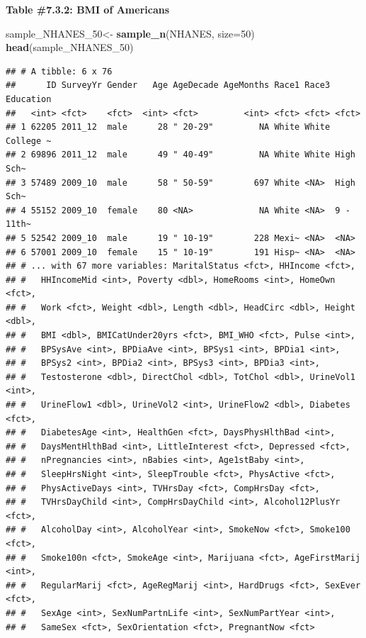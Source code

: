 \documentclass[]{book}
\newenvironment{Shaded}{\begin{snugshade}}{\end{snugshade}}
\newcommand{\DataTypeTok}[1]{\textcolor[rgb]{0.13,0.29,0.53}{#1}}
\newcommand{\DecValTok}[1]{\textcolor[rgb]{0.00,0.00,0.81}{#1}}
\newcommand{\KeywordTok}[1]{\textcolor[rgb]{0.13,0.29,0.53}{\textbf{#1}}}
\newcommand{\NormalTok}[1]{#1}
\newcommand{\StringTok}[1]{\textcolor[rgb]{0.31,0.60,0.02}{#1}}
\begin{document}
\textbf{Table \#7.3.2: BMI of Americans}

\begin{Shaded}
\begin{Highlighting}[]
\NormalTok{sample_NHANES_}\DecValTok{50}\NormalTok{<-}
\StringTok{  }\KeywordTok{sample_n}\NormalTok{(NHANES, }\DataTypeTok{size=}\DecValTok{50}\NormalTok{)}
\KeywordTok{head}\NormalTok{(sample_NHANES_}\DecValTok{50}\NormalTok{)}
\end{Highlighting}
\end{Shaded}

\begin{verbatim}
## # A tibble: 6 x 76
##      ID SurveyYr Gender   Age AgeDecade AgeMonths Race1 Race3 Education
##   <int> <fct>    <fct>  <int> <fct>         <int> <fct> <fct> <fct>    
## 1 62205 2011_12  male      28 " 20-29"         NA White White College ~
## 2 69896 2011_12  male      49 " 40-49"         NA White White High Sch~
## 3 57489 2009_10  male      58 " 50-59"        697 White <NA>  High Sch~
## 4 55152 2009_10  female    80 <NA>             NA White <NA>  9 - 11th~
## 5 52542 2009_10  male      19 " 10-19"        228 Mexi~ <NA>  <NA>     
## 6 57001 2009_10  female    15 " 10-19"        191 Hisp~ <NA>  <NA>     
## # ... with 67 more variables: MaritalStatus <fct>, HHIncome <fct>,
## #   HHIncomeMid <int>, Poverty <dbl>, HomeRooms <int>, HomeOwn <fct>,
## #   Work <fct>, Weight <dbl>, Length <dbl>, HeadCirc <dbl>, Height <dbl>,
## #   BMI <dbl>, BMICatUnder20yrs <fct>, BMI_WHO <fct>, Pulse <int>,
## #   BPSysAve <int>, BPDiaAve <int>, BPSys1 <int>, BPDia1 <int>,
## #   BPSys2 <int>, BPDia2 <int>, BPSys3 <int>, BPDia3 <int>,
## #   Testosterone <dbl>, DirectChol <dbl>, TotChol <dbl>, UrineVol1 <int>,
## #   UrineFlow1 <dbl>, UrineVol2 <int>, UrineFlow2 <dbl>, Diabetes <fct>,
## #   DiabetesAge <int>, HealthGen <fct>, DaysPhysHlthBad <int>,
## #   DaysMentHlthBad <int>, LittleInterest <fct>, Depressed <fct>,
## #   nPregnancies <int>, nBabies <int>, Age1stBaby <int>,
## #   SleepHrsNight <int>, SleepTrouble <fct>, PhysActive <fct>,
## #   PhysActiveDays <int>, TVHrsDay <fct>, CompHrsDay <fct>,
## #   TVHrsDayChild <int>, CompHrsDayChild <int>, Alcohol12PlusYr <fct>,
## #   AlcoholDay <int>, AlcoholYear <int>, SmokeNow <fct>, Smoke100 <fct>,
## #   Smoke100n <fct>, SmokeAge <int>, Marijuana <fct>, AgeFirstMarij <int>,
## #   RegularMarij <fct>, AgeRegMarij <int>, HardDrugs <fct>, SexEver <fct>,
## #   SexAge <int>, SexNumPartnLife <int>, SexNumPartYear <int>,
## #   SameSex <fct>, SexOrientation <fct>, PregnantNow <fct>
\end{verbatim}
\end{document}
